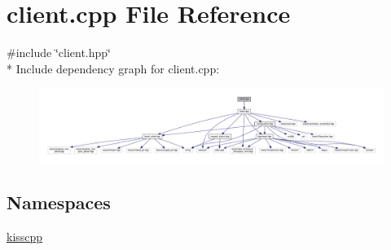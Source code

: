 \hypertarget{a00049}{\section{client.\-cpp File Reference}
\label{a00049}
}
{\ttfamily \#include \char`\"{}client.\-hpp\char`\"{}}\\*
Include dependency graph for client.\-cpp\-:\nopagebreak
\begin{figure}[H]
\begin{center}
\leavevmode
\includegraphics[width=350pt]{a00095}
\end{center}
\end{figure}
\subsection*{Namespaces}
\begin{DoxyCompactItemize}
\item 
\hyperlink{a00089}{kisscpp}
\end{DoxyCompactItemize}

